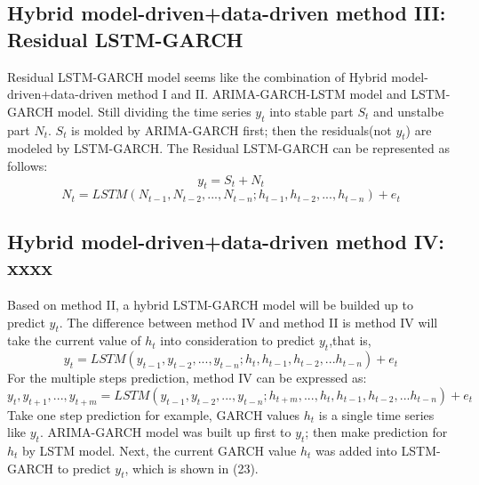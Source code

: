 \subsection{Hybrid model-driven+data-driven method III: Residual LSTM-GARCH}
Residual LSTM-GARCH model seems like the combination of Hybrid model-driven+data-driven method I and II. ARIMA-GARCH-LSTM model and LSTM-GARCH model. Still dividing the time series $y_t$ into stable part $S_t$ and unstalbe part $N_t$. $S_t$ is molded by ARIMA-GARCH first; then the residuals(not $y_t$) are modeled by LSTM-GARCH. The Residual LSTM-GARCH can be represented as follows:
\begin{equation}
    y_t = S_t + N_t
\end{equation}
\begin{equation}
    N_t = LSTM(N_{t-1},N_{t-2},...,N_{t-n};h_{t-1},h_{t-2},...,h_{t-n})+e_t
\end{equation}
\subsection{Hybrid model-driven+data-driven method IV: xxxx}
Based on method II, a hybrid LSTM-GARCH model will be builded up to predict $y_t$. The difference between method IV and method II is method IV will take the current value of $h_t$ into consideration to predict $y_t$,that is,
\begin{equation}
    y_t = LSTM(y_{t-1},y_{t-2},...,y_{t-n};h_t,h_{t-1},h_{t-2},...h_{t-n}) + e_t
\end{equation}
For the multiple steps prediction, method IV can be expressed as:
\begin{equation}
    {y_t,y_{t+1},...,y_{t+m}} = LSTM(y_{t-1},y_{t-2},...,y_{t-n};h_{t+m},...,h_t,h_{t-1},h_{t-2},...h_{t-n}) + e_t
\end{equation}
Take one step prediction for example, GARCH values $h_t$ is a single time series like $y_t$. ARIMA-GARCH model was built up first to $y_t$; then make prediction for $h_t$ by LSTM model. Next, the current GARCH value $h_t$ was added into LSTM-GARCH to predict $y_t$, which is shown in (23). 